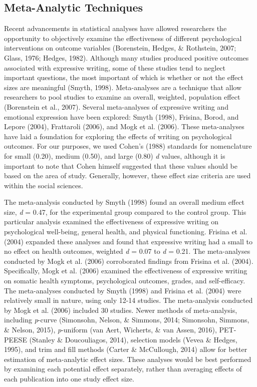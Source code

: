 \documentclass[english,man]{apa6}
\theoremstyle{definition}
\theoremstyle{definition}
\theoremstyle{definition}
\theoremstyle{remark}
\begin{document}
\subsection{Meta-Analytic Techniques}\label{meta-analytic-techniques}

Recent advancements in statistical analyses have allowed researchers the
opportunity to objectively examine the effectiveness of different
psychological interventions on outcome variables (Borenstein, Hedges, \&
Rothstein, 2007; Glass, 1976; Hedges, 1982). Although many studies
produced positive outcomes associated with expressive writing, some of
these studies tend to neglect important questions, the most important of
which is whether or not the effect sizes are meaningful (Smyth, 1998).
Meta-analyses are a technique that allow researchers to pool studies to
examine an overall, weighted, population effect (Borenstein et al.,
2007). Several meta-analyses of expressive writing and emotional
expression have been explored: Smyth (1998), Frisina, Borod, and Lepore
(2004), Frattaroli (2006), and Mogk et al. (2006). These meta-analyses
have laid a foundation for exploring the effects of writing on
psychological outcomes. For our purposes, we used Cohen's (1988)
standards for nomenclature for small (0.20), medium (0.50), and large
(0.80) \emph{d} values, although it is important to note that Cohen
himself suggested that these values should be based on the area of
study. Generally, however, these effect size criteria are used within
the social sciences.

The meta-analysis conducted by Smyth (1998) found an overall medium
effect size, \emph{d} = 0.47, for the experimental group compared to the
control group. This particular analysis examined the effectiveness of
expressive writing on psychological well-being, general health, and
physical functioning. Frisina et al. (2004) expanded these analyses and
found that expressive writing had a small to no effect on health
outcomes, weighted \emph{d} = 0.07 to \emph{d} = 0.21. The meta-analyses
conducted by Mogk et al. (2006) corroborated findings from Frisina et
al. (2004). Specifically, Mogk et al. (2006) examined the effectiveness
of expressive writing on somatic health symptoms, psychological
outcomes, grades, and self-efficacy. The meta-analyses conducted by
Smyth (1998) and Frisina et al. (2004) were relatively small in nature,
using only 12-14 studies. The meta-analysis conducted by Mogk et al.
(2006) included 30 studies. Newer methods of meta-analysis, including
\emph{p}-curve (Simonsohn, Nelson, \& Simmons, 2014; Simonsohn, Simmons,
\& Nelson, 2015), \emph{p}-uniform (van Aert, Wicherts, \& van Assen,
2016), PET-PEESE (Stanley \& Doucouliagos, 2014), selection models
(Vevea \& Hedges, 1995), and trim and fill methods (Carter \&
McCullough, 2014) allow for better estimation of meta-analytic effect
sizes. These analyses would be best performed by examining each
potential effect separately, rather than averaging effects of each
publication into one study effect size.
\end{document}
